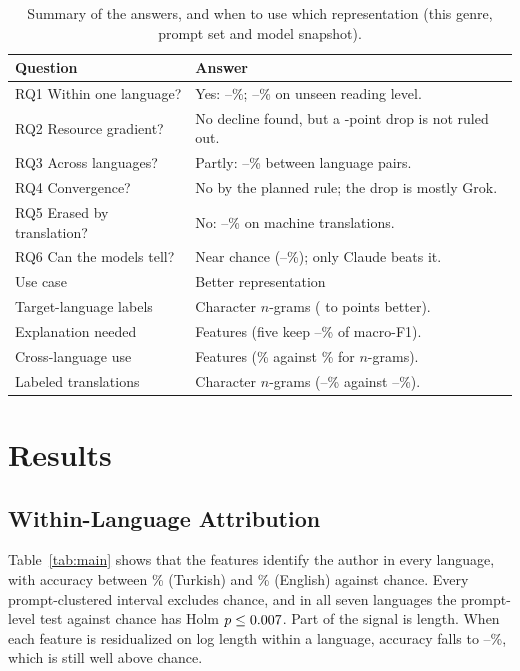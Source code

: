 \documentclass[conference,compsoc]{IEEEtran}
\begin{document}
\begin{table}[t]
\caption{Summary of the answers, and when to use which representation (this genre, prompt set and model snapshot).}
\label{tab:summary}
\centering
\scriptsize
\setlength{\tabcolsep}{3pt}
\begin{tabular}{@{}>{\raggedright\arraybackslash}p{}>{\raggedright\arraybackslash}p{}@{}}
\toprule
Question & Answer \\
\midrule
RQ1 Within one language? & Yes: \LRmin{}--\LRmax{}\%; \LOTOFeatMin{}--\LOTOFeatMax{}\% on unseen reading level. \\
RQ2 Resource gradient? & No decline found, but a \SteepestDeclinePts{}-point drop is not ruled out. \\
RQ3 Across languages? & Partly: \TransferMin{}--\TransferMax{}\% between language pairs. \\
RQ4 Convergence? & No by the planned rule; the drop is mostly Grok. \\
RQ5 Erased by translation? & No: \TrAllMin{}--\TrAllMax{}\% on machine translations. \\
RQ6 Can the models tell? & Near chance (\JudgeMin{}--\JudgeMax{}\%); only Claude beats it. \\
\midrule
Use case & Better representation \\
\midrule
Target-language labels & Character $n$-grams (\GapNGmin{} to \GapNGmax{} points better). \\
Explanation needed & Features (five keep \CurveKfiveShareMin{}--\CurveKfiveShareMax{}\% of macro-F1). \\
Cross-language use & Features (\TransferOff{}\% against \NGFairOff{}\% for $n$-grams). \\
Labeled translations & Character $n$-grams (\NGTrLopoMin{}--\NGTrLopoMax{}\% against \TrAllMin{}--\TrAllMax{}\%). \\
\bottomrule
\end{tabular}
\end{table}

\section{Results}
\subsection{Within-Language Attribution}
Table~\ref{tab:main} shows that the features identify the author in every language, with accuracy between \LRmin{}\% (Turkish) and \LRmax{}\% (English) against \Chance{} chance. Every prompt-clustered interval excludes chance, and in all seven languages the prompt-level test against chance has Holm $p \leq 0.007{}$. Part of the signal is length. When each feature is residualized on log length within a language, accuracy falls to \LRlenMin{}--\LRlenMax{}\%, which is still well above chance.
\end{document}
